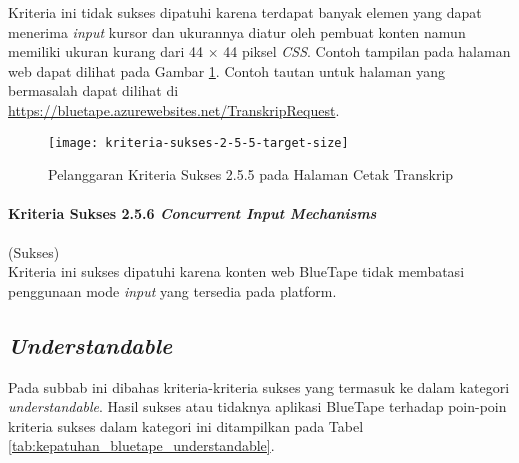 Kriteria ini tidak sukses dipatuhi karena terdapat banyak elemen yang dapat menerima \textit{input} kursor dan ukurannya diatur oleh pembuat konten namun memiliki ukuran kurang dari 44 $\times$ 44 piksel \textit{CSS}. Contoh tampilan pada halaman web dapat dilihat pada Gambar \ref{fig:2.5.5_target_size}. Contoh tautan untuk halaman yang bermasalah dapat dilihat di \url{https://bluetape.azurewebsites.net/TranskripRequest}.

\begin{figure}[H]
    \centering  
    \texttt{[image: kriteria-sukses-2-5-5-target-size]}  
    \caption[Pelanggaran Kriteria Sukses 2.5.5 pada Halaman Cetak Transkrip]{Pelanggaran Kriteria Sukses 2.5.5 pada Halaman Cetak Transkrip}
    \label{fig:2.5.5_target_size}  
\end{figure} 

\paragraph{Kriteria Sukses 2.5.6 \textit{Concurrent Input Mechanisms}}
\label{par:kepatuhan_bluetape_kriteria_sukses_2.5.6}
(Sukses)\\

Kriteria ini sukses dipatuhi karena konten web BlueTape tidak membatasi penggunaan mode \textit{input} yang tersedia pada platform.

\subsection{\textit{Understandable}}
\label{subsec:kepatuhan_bluetape_understandable}
Pada subbab ini dibahas kriteria-kriteria sukses yang termasuk ke dalam kategori \textit{understandable}. Hasil sukses atau tidaknya aplikasi BlueTape terhadap poin-poin kriteria sukses dalam kategori ini ditampilkan pada Tabel \ref{tab:kepatuhan_bluetape_understandable}.

